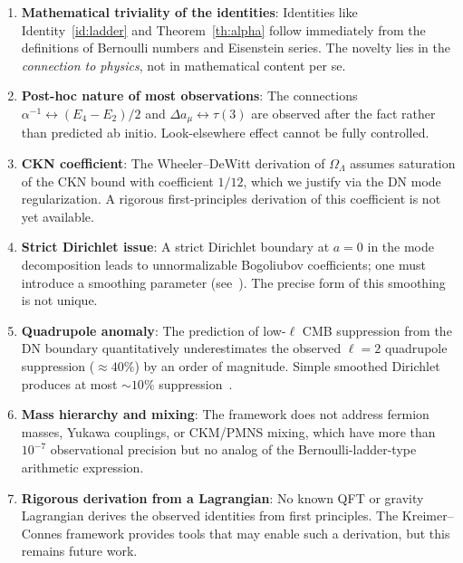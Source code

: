 \documentclass[11pt,a4paper]{article}
\begin{document}
\begin{enumerate}
\item \textbf{Mathematical triviality of the identities}: Identities
like Identity~\ref{id:ladder} and Theorem~\ref{th:alpha} follow
immediately from the definitions of Bernoulli numbers and Eisenstein
series. The novelty lies in the \emph{connection to physics}, not in
mathematical content per se.

\item \textbf{Post-hoc nature of most observations}: The connections
$\alpha^{-1} \leftrightarrow (E_4 - E_2)/2$ and
$\Delta a_\mu \leftrightarrow \tau(3)$ are observed after the fact
rather than predicted ab initio. Look-elsewhere effect cannot be
fully controlled.

\item \textbf{CKN coefficient}: The Wheeler--DeWitt derivation of
$\Omega_\Lambda$ assumes saturation of the CKN bound with coefficient
$1/12$, which we justify via the DN mode regularization. A rigorous
first-principles derivation of this coefficient is not yet
available.

\item \textbf{Strict Dirichlet issue}: A strict Dirichlet boundary
at $a = 0$ in the mode decomposition leads to unnormalizable
Bogoliubov coefficients; one must introduce a smoothing parameter
(see~\cite{wb-low-ell}). The precise form of this smoothing is
not unique.

\item \textbf{Quadrupole anomaly}: The prediction of low-$\ell$ CMB
suppression from the DN boundary quantitatively underestimates the
observed $\ell = 2$ quadrupole suppression ($\approx 40\%$) by an
order of magnitude. Simple smoothed Dirichlet produces at most
$\sim 10\%$ suppression~\cite{wb-low-ell}.

\item \textbf{Mass hierarchy and mixing}: The framework does not
address fermion masses, Yukawa couplings, or CKM/PMNS mixing,
which have more than $10^{-7}$ observational precision but no
analog of the Bernoulli-ladder-type arithmetic expression.

\item \textbf{Rigorous derivation from a Lagrangian}: No known QFT
or gravity Lagrangian derives the observed identities from first
principles. The Kreimer--Connes framework provides tools that may
enable such a derivation, but this remains future work.
\end{enumerate}
\end{document}
